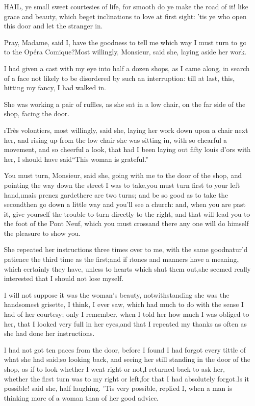 \documentclass[twoside]{article}
\begin{document}


HAIL, ye small sweet courtesies of life, for smooth do ye make the road
of it! like grace and beauty, which beget inclinations to love at first
sight: ’tis ye who open this door and let the stranger in.

\tsk Pray, Madame, said I, have the goodness to tell me which way I must turn
to go to the Opéra Comique?\tsk Most willingly, Monsieur, said she, laying
aside her work.\tsk 

I had given a cast with my eye into half a dozen shops, as I came along,
in search of a face not likely to be disordered by such an interruption:
till at last, this, hitting my fancy, I had walked in.

She was working a pair of ruffles, as she sat in a low chair, on the far
side of the shop, facing the door.

\tsk \i{Très volontiers}, most willingly, said she, laying her work down upon a
chair next her, and rising up from the low chair she was sitting in, with
so chearful a movement, and so cheerful a look, that had I been laying
out fifty louis d’ors with her, I should have said\tsk “This woman is
grateful.”

You must turn, Monsieur, said she, going with me to the door of the shop,
and pointing the way down the street I was to take,\tsk you must turn first
to your left hand,\tsk \i{mais prenez garde}\tsk there are two turns; and be so
good as to take the second\tsk then go down a little way and you’ll see a
church: and, when you are past it, give yourself the trouble to turn
directly to the right, and that will lead you to the foot of the Pont
Neuf, which you must cross\tsk and there any one will do himself the pleasure
to show you.\tsk 

She repeated her instructions three times over to me, with the same
goodnatur’d patience the third time as the first;\tsk and if \i{tones and
manners} have a meaning, which certainly they have, unless to hearts
which shut them out,\tsk she seemed really interested that I should not lose
myself.

I will not suppose it was the woman’s beauty, notwithstanding she was the
handsomest grisette, I think, I ever saw, which had much to do with the
sense I had of her courtesy; only I remember, when I told her how much I
was obliged to her, that I looked very full in her eyes,\tsk and that I
repeated my thanks as often as she had done her instructions.

I had not got ten paces from the door, before I found I had forgot every
tittle of what she had said;\tsk so looking back, and seeing her still
standing in the door of the shop, as if to look whether I went right or
not,\tsk I returned back to ask her, whether the first turn was to my right
or left,\tsk for that I had absolutely forgot.\tsk Is it possible! said she, half
laughing.  ’Tis very possible, replied I, when a man is thinking more of
a woman than of her good advice.
\end{document}
